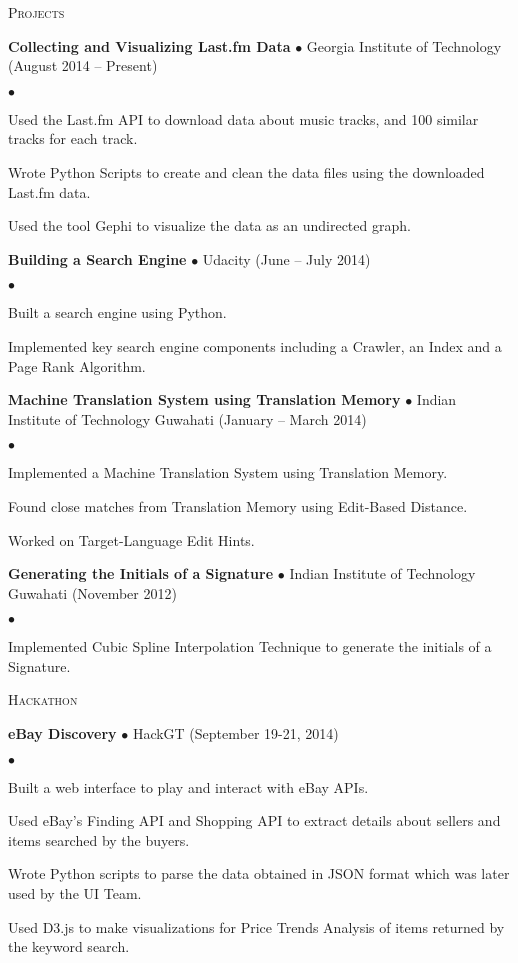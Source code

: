 \documentclass[10.5pt]{article}
\newcommand{\lineunder}{\\\vspace{-9pt}\hrulefill}
\newcommand{\header}[1]{{\normalsize\scshape{#1}} \lineunder}
\newcommand{\project}[3]{{ \textbf{#1} $\bullet$ #2 \hfill (#3)\\  }}
\newenvironment{achievements}{\begin{list}{$\bullet$}{\topsep 0pt \itemsep 0pt}}{\end{list}}
\begin{document}
\vspace{4pt}

\header{Projects}

\project{Collecting and Visualizing Last.fm Data}{Georgia Institute of Technology}{August 2014 -- Present}
	\begin{achievements}
	\item Used the Last.fm API to download data about music tracks, and 100 similar tracks for each track.
	\item Wrote Python Scripts to create and clean the data files using the downloaded Last.fm data.
	\item Used the tool Gephi to visualize the data as an undirected graph.
	\end{achievements}	

\project{Building a Search Engine}{Udacity}{June -- July 2014}
	\begin{achievements}
	\item Built a search engine using Python.
	\item Implemented key search engine components including a Crawler, an Index and a Page Rank Algorithm.
	\end{achievements}
	
\project{Machine Translation System using Translation Memory}{Indian Institute of Technology Guwahati}{January -- March 2014}
	\begin{achievements}
	\item Implemented a Machine Translation System using Translation Memory.
	\item Found close matches from Translation Memory using Edit-Based Distance.
	\item Worked on Target-Language Edit Hints.
	\end{achievements}	
	
\project{Generating the Initials of a Signature}{Indian Institute of Technology Guwahati}{November 2012}
	\begin{achievements}
	\item Implemented Cubic Spline Interpolation Technique to generate the initials of a Signature.
	\end{achievements}
	
\vspace{4pt}

\header{Hackathon}

\project{eBay Discovery}{HackGT}{September 19-21, 2014}
	\begin{achievements}
	\item Built a web interface to play and interact with eBay APIs.
	\item Used eBay's Finding API and Shopping API to extract details about sellers and items searched by the buyers.
	\item Wrote Python scripts to parse the data obtained in JSON format which was later used by the UI Team.
	\item Used D3.js to make visualizations for Price Trends Analysis of items returned by the keyword search.
	\end{achievements}	
	
\end{document}
